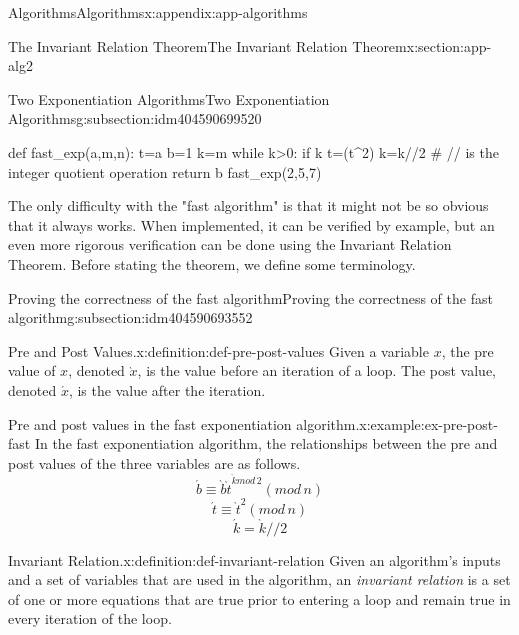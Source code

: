 \documentclass[twoside,10pt,]{book}
\numberwithin{equation}{section}
\begin{document}
\begin{appendixptx}{Algorithms}{}{Algorithms}{}{}{x:appendix:app-algorithms}
\begin{sectionptx}{The Invariant Relation Theorem}{}{The Invariant Relation Theorem}{}{}{x:section:app-alg2}
\begin{subsectionptx}{Two Exponentiation Algorithms}{}{Two Exponentiation Algorithms}{}{}{g:subsection:idm404590699520}
\begin{sageinput}
def fast_exp(a,m,n):
    t=a
    b=1
    k=m
    while k>0:
        if k%
        t=(t^2)%
        k=k//2  # // is the integer quotient operation
    return b    
fast_exp(2,5,7)
\end{sageinput}
The only difficulty with the "fast algorithm" is that it might not be so obvious that it always works.  When implemented, it can be verified by example, but an even more rigorous verification can be done using the Invariant Relation Theorem. Before stating the theorem, we define some terminology.%
\end{subsectionptx}
%
%
\typeout{************************************************}
\typeout{************************************************}
%
\begin{subsectionptx}{Proving the correctness of the fast algorithm}{}{Proving the correctness of the fast algorithm}{}{}{g:subsection:idm404590693552}
\begin{definition}{Pre and Post Values.}{x:definition:def-pre-post-values}%
\label{g:notation:idm404590692704}%
Given a variable \(x\), the pre value of \(x\), denoted \(\grave x\), is the value before an iteration of a loop.  The post value, denoted \(\acute x\), is the value after the iteration.%
\end{definition}
\begin{example}{Pre and post values in the fast exponentiation algorithm.}{x:example:ex-pre-post-fast}%
In the fast exponentiation algorithm, the relationships between the pre and post values of the three variables are as follows.%
\begin{equation*}
\acute{b} \equiv \grave{b} \grave{t}^{\grave{k} mod\,2}(mod\, n)
\end{equation*}
%
\begin{equation*}
\acute{t} \equiv \grave t^2(mod\,n)
\end{equation*}
%
\begin{equation*}
\acute k = \grave k//2
\end{equation*}
%
\end{example}
\begin{definition}{Invariant Relation.}{x:definition:def-invariant-relation}%
Given an algorithm's inputs and a set of variables that are used in the algorithm, an \emph{invariant relation} is a set of one or more equations that are true prior to entering a loop and remain true in every iteration of the loop.%

\end{definition}
\end{subsectionptx}
\end{sectionptx}
\end{appendixptx}
\end{document}
